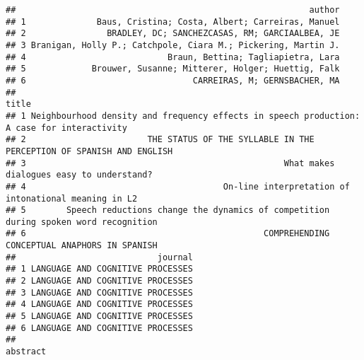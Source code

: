 \documentclass[
  english,
  man]{apa6}
\begin{document}
\begin{verbatim}
##                                                          author
## 1              Baus, Cristina; Costa, Albert; Carreiras, Manuel
## 2                BRADLEY, DC; SANCHEZCASAS, RM; GARCIAALBEA, JE
## 3 Branigan, Holly P.; Catchpole, Ciara M.; Pickering, Martin J.
## 4                            Braun, Bettina; Tagliapietra, Lara
## 5             Brouwer, Susanne; Mitterer, Holger; Huettig, Falk
## 6                                 CARREIRAS, M; GERNSBACHER, MA
##                                                                                        title
## 1 Neighbourhood density and frequency effects in speech production: A case for interactivity
## 2                        THE STATUS OF THE SYLLABLE IN THE PERCEPTION OF SPANISH AND ENGLISH
## 3                                                   What makes dialogues easy to understand?
## 4                                       On-line interpretation of intonational meaning in L2
## 5        Speech reductions change the dynamics of competition during spoken word recognition
## 6                                               COMPREHENDING CONCEPTUAL ANAPHORS IN SPANISH
##                            journal
## 1 LANGUAGE AND COGNITIVE PROCESSES
## 2 LANGUAGE AND COGNITIVE PROCESSES
## 3 LANGUAGE AND COGNITIVE PROCESSES
## 4 LANGUAGE AND COGNITIVE PROCESSES
## 5 LANGUAGE AND COGNITIVE PROCESSES
## 6 LANGUAGE AND COGNITIVE PROCESSES
##                                                                                                                                                                                                                                                                                                                                                                                                                                                                                                                                                                                                                                                                                                                                                                                                                                                                                                                                                                                                                                                                                                                                                                                                                                                                                                                                                                                                                                                                                                                                                                                                                                                                                    abstract

\end{verbatim}
\end{document}
